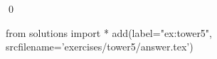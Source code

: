 
\begin{ex} 
  \label{ex:tower5}
  
  \qed
\end{ex} 
\begin{python0}
from solutions import *
add(label="ex:tower5",
    srcfilename='exercises/tower5/answer.tex') 
\end{python0}
